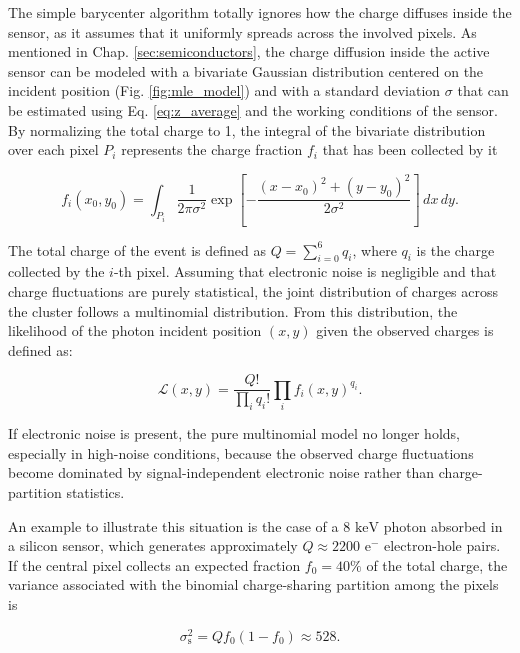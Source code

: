 The simple barycenter algorithm totally ignores how the charge diffuses inside the sensor, as it assumes that it uniformly spreads across the involved pixels. As mentioned in Chap. \ref{sec:semiconductors}, the charge diffusion inside the active sensor can be modeled with a bivariate Gaussian distribution centered on the incident position (Fig. \ref{fig:mle_model}) and with a standard deviation $\sigma$ that can be estimated using Eq. \ref{eq:z_average} and the working conditions of the sensor. By normalizing the total charge to 1, the integral of the bivariate distribution over each pixel $P_i$ represents the charge fraction $f_i$ that has been collected by it

\begin{equation}
f_i (x_0, y_0) = \int_{P_i} \frac{1}{2\pi \sigma^2} \exp \left[ - \frac{(x - x_0)^2 + (y - y_0)^2}{2\sigma^2} \right] \,dx\,dy.
\label{eq:mle_charge_fraction}
\end{equation}

The total charge of the event is defined as $Q = \sum_{i=0}^6 q_i$, where $q_i$ is the charge collected by the $i$-th pixel. Assuming that electronic noise is negligible and that charge fluctuations are purely statistical, the joint distribution of charges across the cluster follows a multinomial distribution. From this distribution, the likelihood of the photon incident position $(x, y)$ given the observed charges is defined as:

\begin{equation}
\mathcal{L}(x, y) = \frac{Q!}{\prod_i q_i!} \prod_i f_i(x,y) ^{q_i}.
\label{eq:mle_multinomial}
\end{equation}

If electronic noise is present, the pure multinomial model no longer holds, especially in high-noise conditions, because the observed charge fluctuations become dominated by signal-independent electronic noise rather than charge-partition statistics. 

An example to illustrate this situation is the case of a $8\text{ keV}$ photon absorbed in a silicon sensor, which generates approximately $Q \approx 2200\text{ e}^-$ electron-hole pairs. If the central pixel collects an expected fraction $f_0 = 40\%$ of the total charge, the variance associated with the binomial charge-sharing partition among the pixels is

\begin{equation}
\sigma_{\text{s}}^2 = Q f_0 (1 - f_0) \approx 528.
\end{equation}

